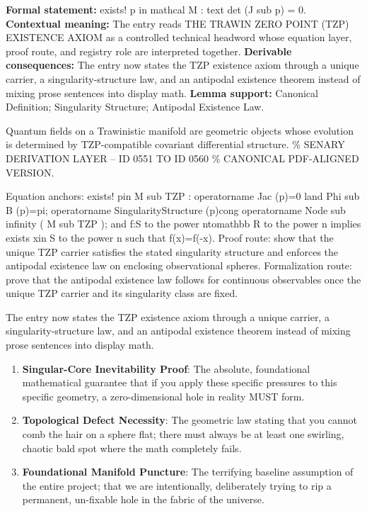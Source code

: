 \begingroup\footnotesize\setlength{\emergencystretch}{3em}\sloppy
\textbf{Formal statement:} exists! p in mathcal M : text det (J sub p) = 0. \textbf{Contextual meaning:} The entry reads THE TRAWIN ZERO POINT (TZP) EXISTENCE AXIOM as a controlled technical headword whose equation layer, proof route, and registry role are interpreted together. \textbf{Derivable consequences:} The entry now states the TZP existence axiom through a unique carrier, a singularity-structure law, and an antipodal existence theorem instead of mixing prose sentences into display math. \textbf{Lemma support:} Canonical Definition; Singularity Structure; Antipodal Existence Law.\par
\endgroup

Quantum fields on a Trawinistic manifold are geometric objects whose evolution is determined by TZP-compatible covariant differential structure. \% SENARY DERIVATION LAYER -- ID 0551 TO ID 0560 \% CANONICAL PDF-ALIGNED VERSION.

Equation anchors: exists! pin M sub TZP : operatorname Jac (p)=0 land Phi sub B (p)=pi; operatorname SingularityStructure (p)cong operatorname Node sub infinity ( M sub TZP ); and f:S to the power ntomathbb R to the power n implies exists xin S to the power n such that f(x)=f(-x). Proof route: show that the unique TZP carrier satisfies the stated singularity structure and enforces the antipodal existence law on enclosing observational spheres. Formalization route: prove that the antipodal existence law follows for continuous observables once the unique TZP carrier and its singularity class are fixed.

The entry now states the TZP existence axiom through a unique carrier, a singularity-structure law, and an antipodal existence theorem instead of mixing prose sentences into display math.
\endgroup

\begin{enumerate}[leftmargin=1.6em,itemsep=6pt,topsep=4pt]
\item \textbf{Singular-Core Inevitability Proof}: The absolute, foundational mathematical guarantee that if you apply these specific pressures to this specific geometry, a zero-dimensional hole in reality MUST form.
\item \textbf{Topological Defect Necessity}: The geometric law stating that you cannot comb the hair on a sphere flat; there must always be at least one swirling, chaotic bald spot where the math completely fails.
\item \textbf{Foundational Manifold Puncture}: The terrifying baseline assumption of the entire project; that we are intentionally, deliberately trying to rip a permanent, un-fixable hole in the fabric of the universe.
\end{enumerate}

